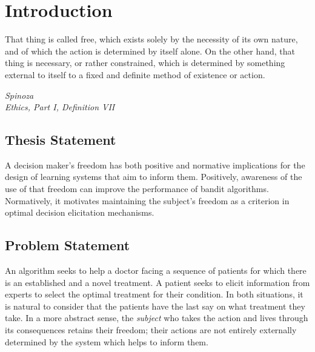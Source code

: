 \chapter{Introduction}
\label{cha:intro}



\epigraph{
That thing is called free, which exists solely by the necessity of its own nature, and of which the action is determined by itself alone. On the other hand, that thing is necessary, or rather constrained, which is determined by something external to itself to a fixed and definite method of existence or action.}{\textit{Spinoza \\Ethics, Part I, Definition VII}}


\section{Thesis Statement}
\label{sec:thesisstatement}

A decision maker's freedom has both positive and normative implications for the design of learning systems that aim to inform them. Positively, awareness of the use of that freedom can improve the performance of bandit algorithms. Normatively, it motivates maintaining the subject's freedom as a criterion in optimal decision elicitation mechanisms.

\section{Problem Statement}
\label{sec:problemstatement}


An algorithm seeks to help a doctor facing a sequence of patients for which there is an established and a novel treatment. A patient seeks to elicit information from experts to select the optimal treatment for their condition. In both situations, it is natural to consider that the patients have the last say on what treatment they take. In a more abstract sense, the \emph{subject} who takes the action and lives through its consequences retains their freedom; their actions are not entirely externally determined by the system which helps to inform them.

